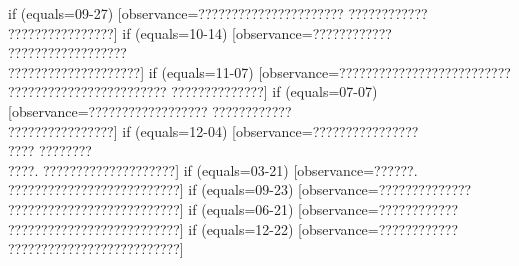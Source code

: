 {  if (equals=09-27) [observance=?????????????????????? ????????????\\ ????????????????]
  if (equals=10-14) [observance=????????????\\ ??????????????????\\ ????????????????????]
  if (equals=11-07) [observance=?????????????????????????? ???????????????????????? ??????????????]
  if (equals=07-07) [observance=?????????????????? ????????????\\ ????????????????]
  if (equals=12-04) [observance=????????????????\\ ???? ????????\\ ????. ????????????????????]
  if (equals=03-21) [observance=??????. ??????????????????????????]
  if (equals=09-23) [observance=??????????????\\ ??????????????????????????]
  if (equals=06-21) [observance=????????????\\ ??????????????????????????]
  if (equals=12-22) [observance=????????????\\ ??????????????????????????]
}
